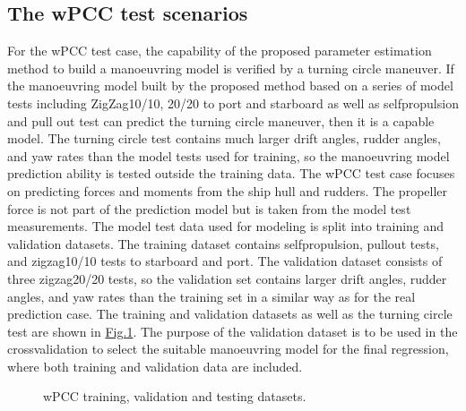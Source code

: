 \documentclass[review]{elsarticle}
\begin{document}
\subsection{The wPCC test scenarios}
\label{\detokenize{05.01_case_studies:the-wpcc-test-scenarios}}
\sphinxAtStartPar
For the wPCC test case, the capability of the proposed parameter estimation method to build a manoeuvring model is verified by a turning circle maneuver. If the manoeuvring model built by the proposed method based on a series of model tests including ZigZag10/10, 20/20 to port and starboard as well as self\sphinxhyphen{}propulsion and pull out test \cite{imo_standards_2002} can predict the turning circle maneuver, then it is a capable model. The turning circle test contains much larger drift angles, rudder angles, and yaw rates than the model tests used for training, so the manoeuvring model prediction ability is tested outside the training data.
The wPCC test case focuses on predicting forces and moments from the ship hull and rudders. The propeller force is not part of the prediction model but is taken from the model test measurements.
The model test data used for modeling is split into training and validation datasets. The training dataset contains self\sphinxhyphen{}propulsion, pull\sphinxhyphen{}out tests, and zigzag10/10 tests to starboard and port. The validation dataset consists of three zigzag20/20 tests, so the validation set contains larger drift angles, rudder angles, and yaw rates than the training set in a similar way as for the real prediction case. The training and validation datasets as well as the turning circle test are shown in \hyperref[\detokenize{05.01_case_studies:fig-traintest}]{Fig.\@ \ref{\detokenize{05.01_case_studies:fig-traintest}}}.
The purpose of the validation dataset is to be used in the cross\sphinxhyphen{}validation to select the suitable manoeuvring model for the final regression, where both training and validation data are included.

\begin{figure}[H]
\centering
\capstart

\noindent{}
\caption{wPCC training, validation and testing datasets.}\label{\detokenize{05.01_case_studies:fig-traintest}}\end{figure}
\end{document}
